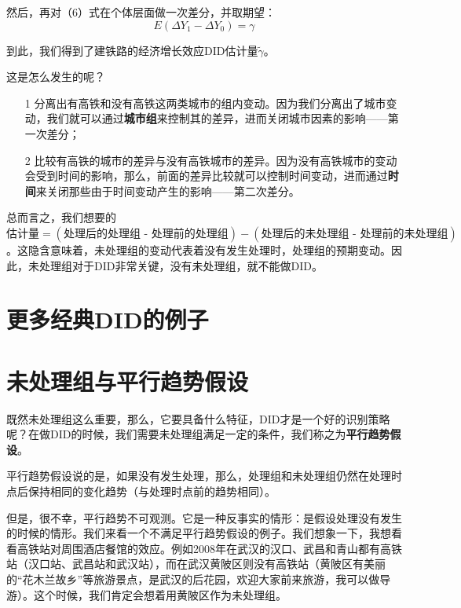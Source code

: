 \documentclass[cn,12pt,math=newtx,citestyle=gb7714-2015,bibstyle=gb7714-2015]{elegantbook}
\begin{document}
	然后，再对（6）式在个体层面做一次差分，并取期望：
	\begin{equation}
		E(\Delta{Y}_1-\Delta{Y}_0)=\gamma
	\end{equation}
	
	到此，我们得到了建铁路的经济增长效应DID估计量$\tilde{\gamma}$。
	
	这是怎么发生的呢？
	
	\begin{itemize}
		\item [1] 分离出有高铁和没有高铁这两类城市的组内变动。因为我们分离出了城市变动，我们就可以通过\textbf{城市组}来控制其的差异，进而关闭城市因素的影响——第一次差分；
		\item [2] 比较有高铁的城市的差异与没有高铁城市的差异。因为没有高铁城市的变动会受到时间的影响，那么，前面的差异比较就可以控制时间变动，进而通过\textbf{时间}来关闭那些由于时间变动产生的影响——第二次差分。
	\end{itemize}

    总而言之，我们想要的$\text{估计量} = (\text{处理后的处理组 - 处理前的处理组}) - (\text{处理后的未处理组 - 处理前的未处理组})$。这隐含意味着，未处理组的变动代表着没有发生处理时，处理组的预期变动。因此，未处理组对于DID非常关键，没有未处理组，就不能做DID。
	
	
	\section{更多经典DID的例子}
	
	
	
	\section{未处理组与平行趋势假设}
	
	既然未处理组这么重要，那么，它要具备什么特征，DID才是一个好的识别策略呢？在做DID的时候，我们需要未处理组满足一定的条件，我们称之为\textbf{平行趋势假设}。
	
	平行趋势假设说的是，如果没有发生处理，那么，处理组和未处理组仍然在处理时点后保持相同的变化趋势（与处理时点前的趋势相同）。
	
	但是，很不幸，平行趋势不可观测。它是一种反事实的情形：是假设处理没有发生的时候的情形。我们来看一个不满足平行趋势假设的例子。我们想象一下，我想看看高铁站对周围酒店餐馆的效应。例如2008年在武汉的汉口、武昌和青山都有高铁站（汉口站、武昌站和武汉站），而在武汉黄陂区则没有高铁站（黄陂区有美丽的“花木兰故乡”等旅游景点，是武汉的后花园，欢迎大家前来旅游，我可以做导游）。这个时候，我们肯定会想着用黄陂区作为未处理组。
	
\end{document}
